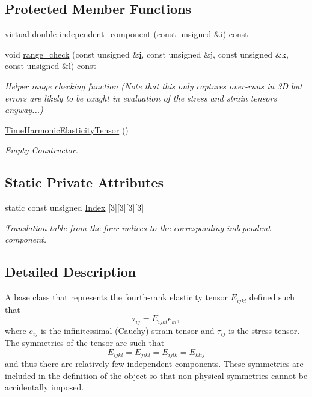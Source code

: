 \subsection*{Protected Member Functions}
\begin{DoxyCompactItemize}
\item 
virtual double \hyperlink{classoomph_1_1TimeHarmonicElasticityTensor_a23ac2beedc3d47b22876faaacc0e27a0}{independent\+\_\+component} (const unsigned \&\hyperlink{cfortran_8h_adb50e893b86b3e55e751a42eab3cba82}{i}) const
\item 
void \hyperlink{classoomph_1_1TimeHarmonicElasticityTensor_a825792d8631abc2a23ed5f12c445384c}{range\+\_\+check} (const unsigned \&\hyperlink{cfortran_8h_adb50e893b86b3e55e751a42eab3cba82}{i}, const unsigned \&j, const unsigned \&k, const unsigned \&l) const
\begin{DoxyCompactList}\small\item\em Helper range checking function (Note that this only captures over-\/runs in 3D but errors are likely to be caught in evaluation of the stress and strain tensors anyway...) \end{DoxyCompactList}\item 
\hyperlink{classoomph_1_1TimeHarmonicElasticityTensor_a1d0ac894717da5725d03a4d18594ef7b}{Time\+Harmonic\+Elasticity\+Tensor} ()
\begin{DoxyCompactList}\small\item\em Empty Constructor. \end{DoxyCompactList}\end{DoxyCompactItemize}
\subsection*{Static Private Attributes}
\begin{DoxyCompactItemize}
\item 
static const unsigned \hyperlink{classoomph_1_1TimeHarmonicElasticityTensor_a74fa19d788154430e65c6652f05b056f}{Index} \mbox{[}3\mbox{]}\mbox{[}3\mbox{]}\mbox{[}3\mbox{]}\mbox{[}3\mbox{]}
\begin{DoxyCompactList}\small\item\em Translation table from the four indices to the corresponding independent component. \end{DoxyCompactList}\end{DoxyCompactItemize}


\subsection{Detailed Description}
A base class that represents the fourth-\/rank elasticity tensor $E_{ijkl}$ defined such that \[\tau_{ij} = E_{ijkl} e_{kl},\] where $e_{ij}$ is the infinitessimal (Cauchy) strain tensor and $\tau_{ij}$ is the stress tensor. The symmetries of the tensor are such that \[E_{ijkl} = E_{jikl} = E_{ijlk} = E_{klij}\] and thus there are relatively few independent components. These symmetries are included in the definition of the object so that non-\/physical symmetries cannot be accidentally imposed. 

